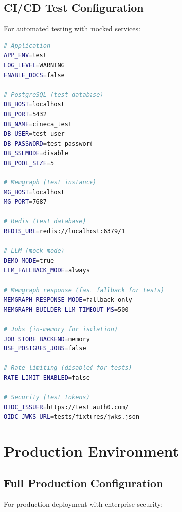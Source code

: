 \subsection{CI/CD Test Configuration}

For automated testing with mocked services:

\begin{lstlisting}[language=bash,caption={.env.test}]
# Application
APP_ENV=test
LOG_LEVEL=WARNING
ENABLE_DOCS=false

# PostgreSQL (test database)
DB_HOST=localhost
DB_PORT=5432
DB_NAME=cineca_test
DB_USER=test_user
DB_PASSWORD=test_password
DB_SSLMODE=disable
DB_POOL_SIZE=5

# Memgraph (test instance)
MG_HOST=localhost
MG_PORT=7687

# Redis (test database)
REDIS_URL=redis://localhost:6379/1

# LLM (mock mode)
DEMO_MODE=true
LLM_FALLBACK_MODE=always

# Memgraph response (fast fallback for tests)
MEMGRAPH_RESPONSE_MODE=fallback-only
MEMGRAPH_BUILDER_LLM_TIMEOUT_MS=500

# Jobs (in-memory for isolation)
JOB_STORE_BACKEND=memory
USE_POSTGRES_JOBS=false

# Rate limiting (disabled for tests)
RATE_LIMIT_ENABLED=false

# Security (test tokens)
OIDC_ISSUER=https://test.auth0.com/
OIDC_JWKS_URL=tests/fixtures/jwks.json
\end{lstlisting}

\section{Production Environment}
\label{app:config:prod}

\subsection{Full Production Configuration}

For production deployment with enterprise security:

